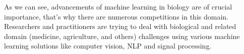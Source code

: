 \documentclass[twoside,11pt]{article}
\begin{document}
As we can see, advancements of machine learning in biology are of crucial importance, that’s why there are numerous competitions in this domain. Researchers and practitioners are trying to deal with biological and related domain (medicine, agriculture, and others) challenges using various machine learning solutions like computer vision, NLP and signal processing. %













\end{document}
